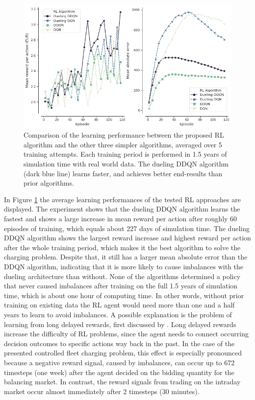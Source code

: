 \documentclass[a4paper, 12pt]{article}
\let\textcite\shortciteA
\begin{document}
\begin{figure}[htb]
\centering
\includegraphics[width=1\linewidth]{fig/rl-learning.png}
\caption[Learning Performance of RL Algorithms]{Comparison of the learning performance between the proposed RL algorithm and the other three simpler algorithms, averaged over 5 training attempts. Each training period is performed in 1.5 years of simulation time with real world data. The dueling DDQN algorithm (dark blue line) learns faster, and achieves better end-results than prior algorithms. \label{fig-rl-learning}}
\end{figure}

In Figure \ref{fig-rl-learning} the average learning performances of the tested RL
approaches are displayed. The experiment shows that the dueling DDQN algorithm
learns the fastest and shows a large increase in mean reward per action after
roughly 60 episodes of training, which equals about 227 days of simulation time.
The dueling DDQN algorithm shows the largest reward increase and highest reward
per action after the whole training period, which makes it the best algorithm to
solve the charging problem. Despite that, it still has a larger mean absolute
error than the DDQN algorithm, indicating that it is more likely to cause
imbalances with the dueling architecture than without. None of the algorithms
determined a policy that never caused imbalances after training on the full 1.5
years of simulation time, which is about one hour of computing time. In other
words, without prior training on existing data the RL agent would need more than
one and a half years to learn to avoid imbalances. A possible explanation is the
problem of learning from long delayed rewards, first discussed by
\textcite{watkins89_learn_from_delay_rewar}. Long delayed rewards increase the
difficulty of RL problems, since the agent needs to connect occurring decision
outcomes to specific actions way back in the past. In the case of the presented
controlled fleet charging problem, this effect is especially pronounced because
a negative reward signal, caused by imbalances, can occur up to 672 timesteps
(one week) after the agent decided on the bidding quantity for the balancing
market. In contrast, the reward signals from trading on the intraday market
occur almost immediately after 2 timesteps (30 minutes).
\end{document}
